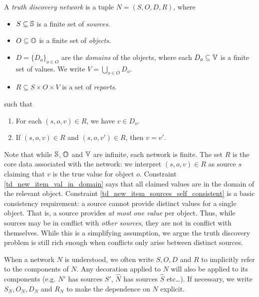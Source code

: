\begin{definition}
    \label{td_new_def_network}
    A \emph{truth discovery network} is a tuple $N = (S, O, D, R)$, where
    \begin{itemize}
        \item $S \subseteq \S$ is a finite set of \emph{sources}.
        \item $O \subseteq \O$ is a finite set of \emph{objects}.
        \item $D = \{D_o\}_{o \in O}$ are the \emph{domains} of the objects,
              where each $D_o \subseteq \V$ is a finite set of values. We write
              $V = \bigcup_{o \in O}{D_o}$.
        \item $R \subseteq S \times O \times V$ is a set of \emph{reports}.
    \end{itemize}
    such that
    \begin{enumerate}
        \item\label{td_new_item_val_in_domain}
            For each $(s, o, v) \in R$, we have $v \in D_o$.
        \item\label{td_new_item_sources_self_consistent}
            If $(s, o, v) \in R$ and $(s, o, v') \in R$, then $v = v'$.
    \end{enumerate}
\end{definition}

Note that while $\S$, $\O$ and $\V$ are infinite, each network is finite. The
set $R$ is the core data associated with the network: we interpret $(s, o, v)
\in R$ as source $s$ claiming that $v$ is the true value for object $o$.
Constraint \cref{td_new_item_val_in_domain} says that all claimed values are in
the domain of the relevant object. Constraint
\cref{td_new_item_sources_self_consistent} is a basic consistency
requirement: a source cannot provide distinct values for a single object. That
is, a source provides \emph{at most one value} per object.  Thus, while sources
may be in conflict with \emph{other sources}, they are not in conflict with
themselves.  While this is a simplifying assumption, we argue the truth
discovery problem is still rich enough when conflicts only arise between
distinct sources.

When a network $N$ is understood, we often write $S, O, D$ and $R$ to
implicitly refer to the components of $N$. Any decoration applied to $N$ will
also be applied to its components (e.g. $N'$ has sources $S'$, $\hat{N}$ has
sources $\hat{S}$ etc\ldots). If necessary, we write $S_N, O_N, D_N$ and $R_N$
to make the dependence on $N$ explicit.

